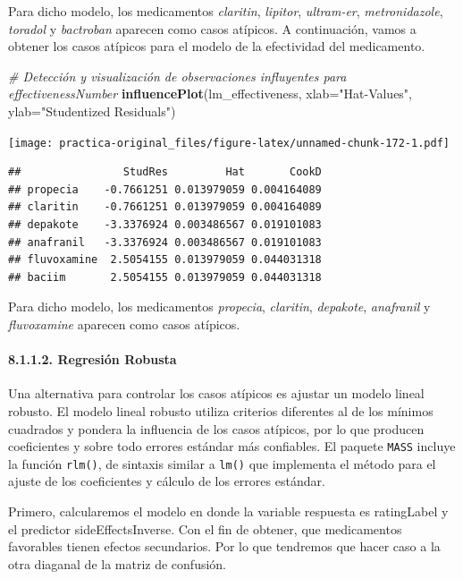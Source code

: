 \documentclass[spanish,]{article}
\newenvironment{Shaded}{\begin{snugshade}}{\end{snugshade}}
\newcommand{\KeywordTok}[1]{\textcolor[rgb]{0.13,0.29,0.53}{\textbf{#1}}}
\newcommand{\DataTypeTok}[1]{\textcolor[rgb]{0.13,0.29,0.53}{#1}}
\newcommand{\StringTok}[1]{\textcolor[rgb]{0.31,0.60,0.02}{#1}}
\newcommand{\CommentTok}[1]{\textcolor[rgb]{0.56,0.35,0.01}{\textit{#1}}}
\newcommand{\NormalTok}[1]{#1}
\let\oldparagraph\paragraph
\renewcommand{\paragraph}[1]{\oldparagraph{#1}\mbox{}}
\begin{document}
Para dicho modelo, los medicamentos \emph{claritin}, \emph{lipitor},
\emph{ultram-er}, \emph{metronidazole}, \emph{toradol} y
\emph{bactroban} aparecen como casos atípicos. A continuación, vamos a
obtener los casos atípicos para el modelo de la efectividad del
medicamento.

\begin{Shaded}
\begin{Highlighting}[]
\CommentTok{# Detección y visualización de observaciones influyentes para effectivenessNumber}
\KeywordTok{influencePlot}\NormalTok{(lm_effectiveness, }\DataTypeTok{xlab=}\StringTok{"Hat-Values"}\NormalTok{, }\DataTypeTok{ylab=}\StringTok{"Studentized Residuals"}\NormalTok{)}
\end{Highlighting}
\end{Shaded}

\texttt{[image: practica-original\_files/figure-latex/unnamed-chunk-172-1.pdf]}

\begin{verbatim}
##                StudRes         Hat       CookD
## propecia    -0.7661251 0.013979059 0.004164089
## claritin    -0.7661251 0.013979059 0.004164089
## depakote    -3.3376924 0.003486567 0.019101083
## anafranil   -3.3376924 0.003486567 0.019101083
## fluvoxamine  2.5054155 0.013979059 0.044031318
## baciim       2.5054155 0.013979059 0.044031318
\end{verbatim}

Para dicho modelo, los medicamentos \emph{propecia}, \emph{claritin},
\emph{depakote}, \emph{anafranil} y \emph{fluvoxamine} aparecen como
casos atípicos.

\paragraph{8.1.1.2. Regresión Robusta}\label{regresion-robusta}

Una alternativa para controlar los casos atípicos es ajustar un modelo
lineal robusto. El modelo lineal robusto utiliza criterios diferentes al
de los mínimos cuadrados y pondera la influencia de los casos atípicos,
por lo que producen coeficientes y sobre todo errores estándar más
confiables. El paquete \texttt{MASS} incluye la función \texttt{rlm()},
de sintaxis similar a \texttt{lm()} que implementa el método para el
ajuste de los coeficientes y cálculo de los errores estándar.

Primero, calcularemos el modelo en donde la variable respuesta es
ratingLabel y el predictor sideEffectsInverse. Con el fin de obtener,
que medicamentos favorables tienen efectos secundarios. Por lo que
tendremos que hacer caso a la otra diaganal de la matriz de confusión.
\end{document}
